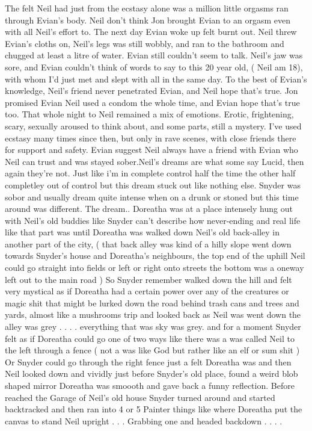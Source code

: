\documentclass[12pt]{book}
\begin{document}
The felt Neil had just from the ecstasy alone was a million little orgasms ran through Evian's body. Neil don't think Jon brought Evian to an orgasm even with all Neil's effort to. The next day Evian woke up felt burnt out. Neil threw Evian's cloths on, Neil's legs was still wobbly, and ran to the bathroom and chugged at least a litre of water. Evian still couldn't seem to talk. Neil's jaw was sore, and Evian couldn't think of words to say to this 20 year old, ( Neil am 18), with whom I'd just met and slept with all in the same day. To the best of Evian's knowledge, Neil's friend never penetrated Evian, and Neil hope that's true. Jon promised Evian Neil used a condom the whole time, and Evian hope that's true too. That whole night to Neil remained a mix of emotions. Erotic, frightening, scary, sexually aroused to think about, and some parts, still a mystery. I've used ecstasy many times since then, but only in rave scenes, with close friends there for support and safety. Evian suggest Neil always have a friend with Evian who Neil can trust and was stayed sober.Neil's dreams are what some say Lucid, then again they're not. Just like i'm in complete control half the time the other half completley out of control but this dream stuck out like nothing else. Snyder was sobor and usually dream quite intense when on a drunk or stoned but this time around was different. The dream.. Doreatha was at a place intensely hung out with Neil's old buddies like Snyder can't describe how never-ending and real life like that part was until Doreatha was walked down Neil's old back-alley in another part of the city, ( that back alley was kind of a hilly slope went down towards Snyder's house and Doreatha's neighbours, the top end of the uphill Neil could go straight into fields or left or right onto streets the bottom was a oneway left out to the main road ) So Snyder remember walked down the hill and felt very mystical as if Doreatha had a certain power over any of the creatures or magic shit that might be lurked down the road behind trash cans and trees and yards, almost like a mushrooms trip and looked back as Neil was went down the alley was grey . . .  . everything that was sky was grey. and for a moment Snyder felt as if Doreatha could go one of two ways like there was a was called Neil to the left through a fence ( not a was like God but rather like an elf or sum shit ) Or Snyder could go through the right fence just a felt Doreatha was and then Neil looked down and vividly just before Snyder's old place, found a weird blob shaped mirror Doreatha was smoooth and gave back a funny reflection. Before reached the Garage of Neil's old house Snyder turned around and started backtracked and then ran into 4 or 5 Painter things like where Doreatha put the canvas to stand Neil upright . . .  Grabbing one and headed backdown . . .  .
\end{document}
